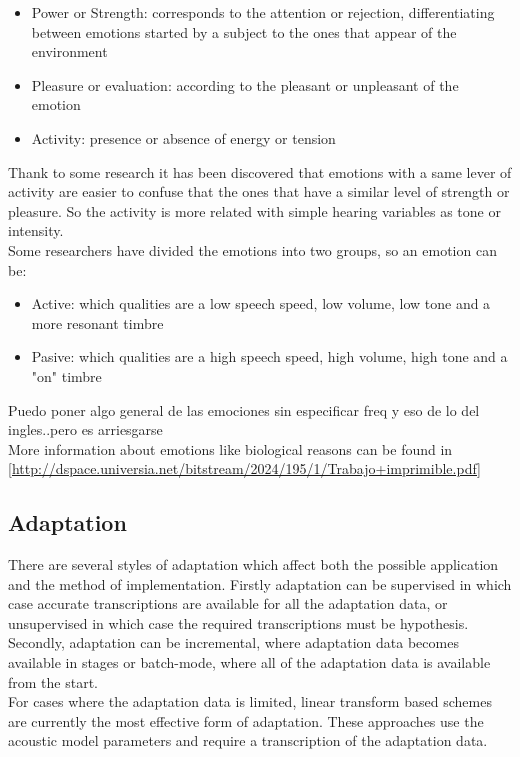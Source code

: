 \begin{itemize}
	\item Power or Strength: corresponds to the attention or rejection, differentiating between emotions started by a subject to the ones that appear of the environment
	\item Pleasure or evaluation: according to the pleasant or unpleasant of the emotion
	\item Activity: presence or absence of energy or tension
\end{itemize}
Thank to some research it has been discovered that emotions with a same lever of activity are easier to confuse that the ones that have a similar level of strength or pleasure. So the activity is more related with simple hearing variables as tone or intensity.\\
Some researchers have divided the emotions into two groups, so an emotion can be:
\begin{itemize}
	\item Active: which qualities are a low speech speed, low volume, low tone and a more resonant timbre
	\item Pasive: which qualities are a high speech speed, high volume, high tone and a "on" timbre
\end{itemize}
Puedo poner algo general de las emociones sin especificar freq y eso de lo del ingles..pero es arriesgarse\\
More information about emotions like biological reasons can be found in \ref{http://dspace.universia.net/bitstream/2024/195/1/Trabajo+imprimible.pdf}

\subsection{Adaptation}\label{badapt}
There are several styles of adaptation which affect both the possible application and the method of implementation. Firstly adaptation can be supervised in which case accurate transcriptions are available for all the adaptation data, or unsupervised in which case the required transcriptions must be hypothesis. Secondly, adaptation can be incremental, where adaptation data becomes available in stages or batch-mode, where all of the adaptation data is available from the start.\\
For cases where the adaptation data is limited, linear transform based schemes are currently the most effective form of adaptation. These approaches use the acoustic model parameters and require a transcription of the adaptation data.
